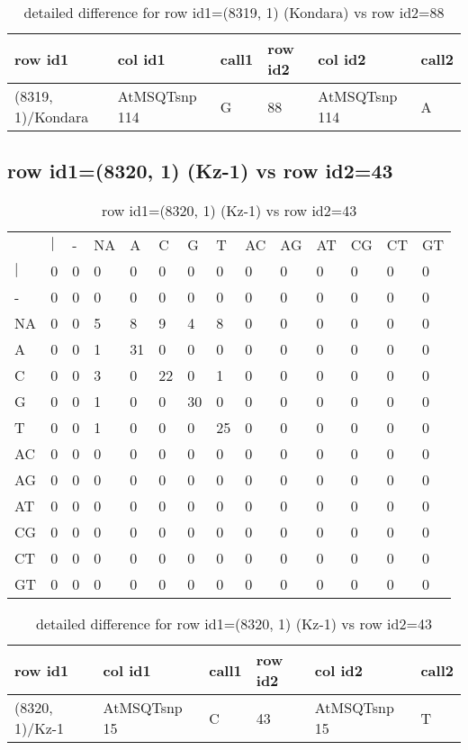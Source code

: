 \begin{center}
\begin{longtable}{|l|l|l|l|l|l|}
\caption{detailed difference for row id1=(8319, 1) (Kondara) vs row id2=88} \label{table_dm317}\\
\hline
row id1&col id1&call1&row id2&col id2&call2\\
\hline
(8319, 1)/Kondara&AtMSQTsnp 114&G&88&AtMSQTsnp 114&A\\
\hline
\end{longtable}
\end{center}

\subsection{row id1=(8320, 1) (Kz-1) vs row id2=43}
\begin{center}
\begin{longtable}{|l|l|l|l|l|l|l|l|l|l|l|l|l|l|}
\caption{row id1=(8320, 1) (Kz-1) vs row id2=43} \label{table_dm318}\\
\hline
\\
\hline
&$|$&-&NA&A&C&G&T&AC&AG&AT&CG&CT&GT\\
$|$&0&0&0&0&0&0&0&0&0&0&0&0&0\\
-&0&0&0&0&0&0&0&0&0&0&0&0&0\\
NA&0&0&5&8&9&4&8&0&0&0&0&0&0\\
A&0&0&1&31&0&0&0&0&0&0&0&0&0\\
C&0&0&3&0&22&0&1&0&0&0&0&0&0\\
G&0&0&1&0&0&30&0&0&0&0&0&0&0\\
T&0&0&1&0&0&0&25&0&0&0&0&0&0\\
AC&0&0&0&0&0&0&0&0&0&0&0&0&0\\
AG&0&0&0&0&0&0&0&0&0&0&0&0&0\\
AT&0&0&0&0&0&0&0&0&0&0&0&0&0\\
CG&0&0&0&0&0&0&0&0&0&0&0&0&0\\
CT&0&0&0&0&0&0&0&0&0&0&0&0&0\\
GT&0&0&0&0&0&0&0&0&0&0&0&0&0\\
\hline
\end{longtable}
\end{center}

\begin{center}
\begin{longtable}{|l|l|l|l|l|l|}
\caption{detailed difference for row id1=(8320, 1) (Kz-1) vs row id2=43} \label{table_dm319}\\
\hline
row id1&col id1&call1&row id2&col id2&call2\\
\hline
(8320, 1)/Kz-1&AtMSQTsnp 15&C&43&AtMSQTsnp 15&T\\
\hline
\end{longtable}
\end{center}

